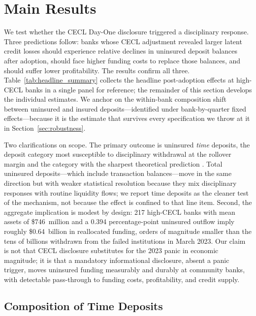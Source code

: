 \section{Main Results}
\label{sec:results}

We test whether the CECL Day-One disclosure triggered a disciplinary
response.  Three predictions follow: banks whose CECL adjustment revealed
larger latent credit losses should experience relative declines in
uninsured deposit balances after adoption, should face higher funding
costs to replace those balances, and should suffer lower profitability.
The results confirm all three.  Table~\ref{tab:headline_summary} collects
the headline post-adoption effects at high-CECL banks in a single panel
for reference; the remainder of this section develops the individual
estimates.  We anchor on the within-bank composition shift between
uninsured and insured deposits---identified under bank-by-quarter fixed
effects---because it is the estimate that survives every specification
we throw at it in Section~\ref{sec:robustness}.

Two clarifications on scope.  The primary outcome is uninsured
\emph{time} deposits, the deposit category most susceptible to
disciplinary withdrawal at the rollover margin and the category with the
sharpest theoretical prediction \citep{maechler2006dynamic,
egan2017deposit}.  Total uninsured deposits---which include transaction
balances---move in the same direction but with weaker statistical
resolution because they mix disciplinary responses with routine
liquidity flows; we report time deposits as the cleaner test of the
mechanism, not because the effect is confined to that line item.  Second,
the aggregate implication is modest by design: 217 high-CECL banks with
mean assets of \$746~million and a 0.394 percentage-point uninsured
outflow imply roughly \$0.64~billion in reallocated funding, orders of
magnitude smaller than the tens of billions withdrawn from the failed
institutions in March 2023.  Our claim is not that CECL disclosure
substitutes for the 2023 panic in economic magnitude; it is that a
mandatory informational disclosure, absent a panic trigger, moves
uninsured funding measurably and durably at community banks, with
detectable pass-through to funding costs, profitability, and credit
supply.

\subsection{Composition of Time Deposits}
\label{sec:results:time_deposits}

